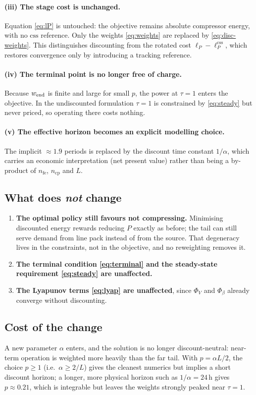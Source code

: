 \documentclass[11pt]{article}
\newcommand{\css}{\mathrm{css}}
\begin{document}
\paragraph{(iii) The stage cost is unchanged.}
Equation \eqref{eq:lP} is untouched: the objective remains absolute
compressor energy, with no $\css$ reference. Only the weights
\eqref{eq:weights} are replaced by \eqref{eq:disc-weights}. This distinguishes
discounting from the rotated cost $\ell_P-\ell_P^{\css}$, which restores
convergence only by introducing a tracking reference.

\paragraph{(iv) The terminal point is no longer free of charge.}
Because $w_{\rm end}$ is finite and large for small $p$, the power at
$\tau=1$ enters the objective. In the undiscounted formulation $\tau=1$ is
constrained by \eqref{eq:steady} but never priced, so operating there costs
nothing.

\paragraph{(v) The effective horizon becomes an explicit modelling choice.}
The implicit $\approx 1.9$ periods is replaced by the discount time constant
$1/\alpha$, which carries an economic interpretation (net present value)
rather than being a by-product of $n_{\mathrm{fe}}$, $n_{\mathrm{cp}}$ and
$L$.

\subsection{What does \emph{not} change}

\begin{enumerate}
\item \textbf{The optimal policy still favours not compressing.} Minimising
      discounted energy rewards reducing $P$ exactly as before; the tail can
      still serve demand from line pack instead of from the source. That
      degeneracy lives in the constraints, not in the objective, and no
      reweighting removes it.
\item \textbf{The terminal condition \eqref{eq:terminal} and the steady-state
      requirement \eqref{eq:steady} are unaffected.}
\item \textbf{The Lyapunov terms \eqref{eq:lyap} are unaffected}, since
      $\Phi_V$ and $\Phi_\beta$ already converge without discounting.
\end{enumerate}

\subsection{Cost of the change}

A new parameter $\alpha$ enters, and the solution is no longer
discount-neutral: near-term operation is weighted more heavily than the far
tail. With $p=\alpha L/2$, the choice $p\ge 1$ (i.e.\ $\alpha\ge 2/L$)
gives the cleanest numerics but implies a short discount horizon; a longer,
more physical horizon such as $1/\alpha = 24\,$h gives $p\approx 0.21$, which
is integrable but leaves the weights strongly peaked near $\tau=1$.
\end{document}
